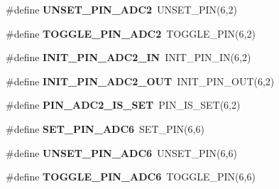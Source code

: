 \begin{DoxyCompactItemize}
\item 
\hypertarget{group__chaos__internal_gadda3062005f03851380105afdde81228}{\#define {\bfseries U\-N\-S\-E\-T\-\_\-\-P\-I\-N\-\_\-\-A\-D\-C2}~U\-N\-S\-E\-T\-\_\-\-P\-I\-N(6,2)}\label{group__chaos__internal_gadda3062005f03851380105afdde81228}

\item 
\hypertarget{group__chaos__internal_ga7e214e65f723135edb6b31ba2c1f8b77}{\#define {\bfseries T\-O\-G\-G\-L\-E\-\_\-\-P\-I\-N\-\_\-\-A\-D\-C2}~T\-O\-G\-G\-L\-E\-\_\-\-P\-I\-N(6,2)}\label{group__chaos__internal_ga7e214e65f723135edb6b31ba2c1f8b77}

\item 
\hypertarget{group__chaos__internal_ga0a2ba4d712fad1cec93cc0874b21d2f6}{\#define {\bfseries I\-N\-I\-T\-\_\-\-P\-I\-N\-\_\-\-A\-D\-C2\-\_\-\-I\-N}~I\-N\-I\-T\-\_\-\-P\-I\-N\-\_\-\-I\-N(6,2)}\label{group__chaos__internal_ga0a2ba4d712fad1cec93cc0874b21d2f6}

\item 
\hypertarget{group__chaos__internal_gacdb25193366b7bfb38b2a5a6092d2379}{\#define {\bfseries I\-N\-I\-T\-\_\-\-P\-I\-N\-\_\-\-A\-D\-C2\-\_\-\-O\-U\-T}~I\-N\-I\-T\-\_\-\-P\-I\-N\-\_\-\-O\-U\-T(6,2)}\label{group__chaos__internal_gacdb25193366b7bfb38b2a5a6092d2379}

\item 
\hypertarget{group__chaos__internal_ga263deaaf27eac90abf8569d4af12352e}{\#define {\bfseries P\-I\-N\-\_\-\-A\-D\-C2\-\_\-\-I\-S\-\_\-\-S\-E\-T}~P\-I\-N\-\_\-\-I\-S\-\_\-\-S\-E\-T(6,2)}\label{group__chaos__internal_ga263deaaf27eac90abf8569d4af12352e}

\item 
\hypertarget{group__chaos__internal_ga29c23245607503b0f680a8ef73a40fdb}{\#define {\bfseries S\-E\-T\-\_\-\-P\-I\-N\-\_\-\-A\-D\-C6}~S\-E\-T\-\_\-\-P\-I\-N(6,6)}\label{group__chaos__internal_ga29c23245607503b0f680a8ef73a40fdb}

\item 
\hypertarget{group__chaos__internal_gaad6c1e4ab5260c447fe612ea6b7b5489}{\#define {\bfseries U\-N\-S\-E\-T\-\_\-\-P\-I\-N\-\_\-\-A\-D\-C6}~U\-N\-S\-E\-T\-\_\-\-P\-I\-N(6,6)}\label{group__chaos__internal_gaad6c1e4ab5260c447fe612ea6b7b5489}

\item 
\hypertarget{group__chaos__internal_gac0932613fe080adcf57a630b2732e3bd}{\#define {\bfseries T\-O\-G\-G\-L\-E\-\_\-\-P\-I\-N\-\_\-\-A\-D\-C6}~T\-O\-G\-G\-L\-E\-\_\-\-P\-I\-N(6,6)}\label{group__chaos__internal_gac0932613fe080adcf57a630b2732e3bd}


\end{DoxyCompactItemize}
